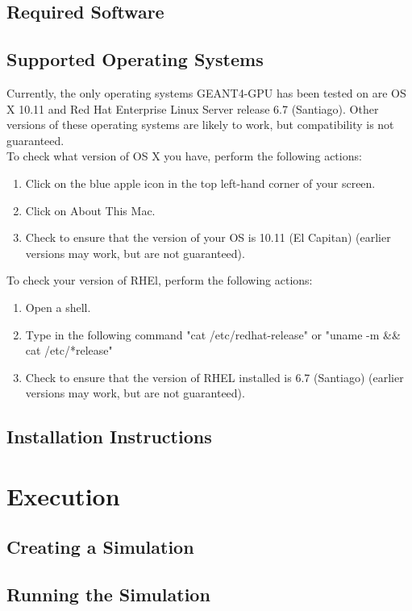\documentclass[12pt]{article}
\begin{document}
\subsection{Required Software} %


\subsection{Supported Operating Systems} %
Currently, the only operating systems GEANT4-GPU has been tested on are OS X 10.11 and  Red Hat Enterprise Linux Server release 6.7 (Santiago). Other versions of these operating systems are likely to work, but compatibility is not guaranteed.\\
To check what version of OS X you have, perform the following actions:
\begin{enumerate}
\item Click on the blue apple icon in the top left-hand corner of your screen.
\item Click on About This Mac.
\item Check to ensure that the version of your OS is 10.11 (El Capitan) (earlier versions may work, but are not guaranteed).
\end{enumerate}
To check your version of RHEl, perform the following actions:
\begin{enumerate}
\item Open a shell.
\item Type in the following command "cat /etc/redhat-release" or "uname -m \&\& cat /etc/*release"
\item Check to ensure that the version of RHEL installed is 6.7 (Santiago) (earlier versions may work, but are not guaranteed).
\end{enumerate}
\subsection{Installation Instructions} %

\section{Execution} %
\subsection{Creating a Simulation} %
\subsection{Running the Simulation} %
\end{document}
